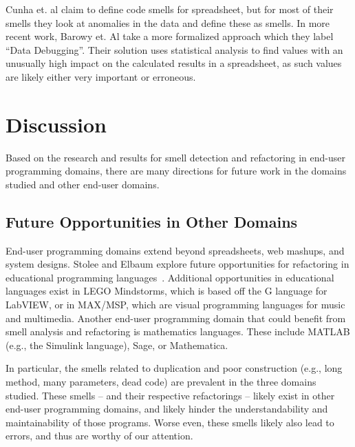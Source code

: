 \documentclass[10pt,conference,compsocconf]{IEEEtran}
\begin{document}

Cunha et. al \cite{cunha2012towards} claim to define code smells for spreadsheet, but for most of their smells they look at  anomalies in the data and define these as smells.
In more recent work, Barowy et. Al \cite{barowy2014checkcell} take a  more formalized approach which they label ``Data Debugging''.
Their solution uses statistical analysis to find values with an unusually high impact on the calculated results in a spreadsheet, as such values are likely either very important or erroneous.

\section{Discussion}
\label{sec:discussion}

Based on the research and results for smell detection and refactoring in end-user programming domains, there are many directions for future work in the domains studied and other end-user domains.

\subsection{Future Opportunities in Other Domains}
End-user programming domains extend beyond spreadsheets, web mashups, and system designs. Stolee and Elbaum explore future opportunities for refactoring in educational programming languages~\cite{StoleeTSE2013}. Additional opportunities in educational languages exist in LEGO Mindstorms, which is based off the G language for LabVIEW, or in MAX/MSP, which are visual programming languages for music and multimedia.  Another end-user programming domain that could benefit from smell analysis and refactoring is mathematics languages. These include MATLAB (e.g., the Simulink language), Sage, or Mathematica.

In particular, the smells related to duplication and poor construction (e.g., long method, many parameters, dead code) are  prevalent in the three domains studied. These smells -- and their respective refactorings -- likely exist in other end-user programming domains, and likely hinder the understandability and maintainability of those programs. Worse even, these smells likely also lead to errors, and thus are worthy of our attention. 
\end{document}
